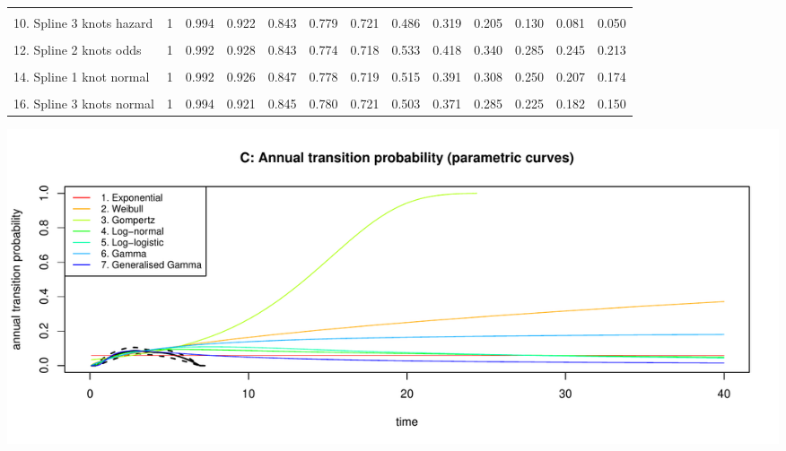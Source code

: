 \documentclass[
]{article}
\begin{document}
\begin{table}
{\begin{tabular}[t]{lrrrrrrrrrrrr}
\cellcolor{gray!6}{9. Spline 2 knots hazard} & \cellcolor{gray!6}{1} & \cellcolor{gray!6}{0.992} & \cellcolor{gray!6}{0.928} & \cellcolor{gray!6}{0.843} & \cellcolor{gray!6}{0.774} & \cellcolor{gray!6}{0.719} & \cellcolor{gray!6}{0.523} & \cellcolor{gray!6}{0.384} & \cellcolor{gray!6}{0.283} & \cellcolor{gray!6}{0.210} & \cellcolor{gray!6}{0.156} & \cellcolor{gray!6}{0.116}\\
10. Spline 3 knots hazard & 1 & 0.994 & 0.922 & 0.843 & 0.779 & 0.721 & 0.486 & 0.319 & 0.205 & 0.130 & 0.081 & 0.050\\
\cellcolor{gray!6}{11. Spline 1 knot odds} & \cellcolor{gray!6}{1} & \cellcolor{gray!6}{0.992} & \cellcolor{gray!6}{0.927} & \cellcolor{gray!6}{0.843} & \cellcolor{gray!6}{0.774} & \cellcolor{gray!6}{0.718} & \cellcolor{gray!6}{0.532} & \cellcolor{gray!6}{0.415} & \cellcolor{gray!6}{0.338} & \cellcolor{gray!6}{0.283} & \cellcolor{gray!6}{0.242} & \cellcolor{gray!6}{0.211}\\
12. Spline 2 knots odds & 1 & 0.992 & 0.928 & 0.843 & 0.774 & 0.718 & 0.533 & 0.418 & 0.340 & 0.285 & 0.245 & 0.213\\
\cellcolor{gray!6}{13. Spline 3 knots odds} & \cellcolor{gray!6}{1} & \cellcolor{gray!6}{0.994} & \cellcolor{gray!6}{0.922} & \cellcolor{gray!6}{0.844} & \cellcolor{gray!6}{0.780} & \cellcolor{gray!6}{0.721} & \cellcolor{gray!6}{0.498} & \cellcolor{gray!6}{0.363} & \cellcolor{gray!6}{0.277} & \cellcolor{gray!6}{0.220} & \cellcolor{gray!6}{0.180} & \cellcolor{gray!6}{0.151}\\
14. Spline 1 knot normal & 1 & 0.992 & 0.926 & 0.847 & 0.778 & 0.719 & 0.515 & 0.391 & 0.308 & 0.250 & 0.207 & 0.174\\
\cellcolor{gray!6}{15. Spline 2 knots normal} & \cellcolor{gray!6}{1} & \cellcolor{gray!6}{0.992} & \cellcolor{gray!6}{0.929} & \cellcolor{gray!6}{0.842} & \cellcolor{gray!6}{0.773} & \cellcolor{gray!6}{0.718} & \cellcolor{gray!6}{0.538} & \cellcolor{gray!6}{0.426} & \cellcolor{gray!6}{0.350} & \cellcolor{gray!6}{0.295} & \cellcolor{gray!6}{0.253} & \cellcolor{gray!6}{0.220}\\
16. Spline 3 knots normal & 1 & 0.994 & 0.921 & 0.845 & 0.780 & 0.721 & 0.503 & 0.371 & 0.285 & 0.225 & 0.182 & 0.150\\
\bottomrule
\end{tabular}}
\end{table}

\begin{flushleft}\includegraphics[height=0.29\textheight]{Images/validate_extrapolation1-3} \end{flushleft}
\end{document}
